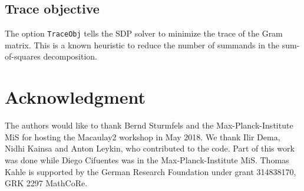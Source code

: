 \documentclass[11pt]{amsart}
\theoremstyle{plain}%
\theoremstyle{definition}
\theoremstyle{remark}
\newcommand{\Mac}{Macaulay2\xspace}
\begin{document}
\subsection*{Trace objective}
The option \verb|TraceObj| tells the SDP solver to minimize the trace of the Gram matrix.
This is a known heuristic to reduce the number of summands in the sum-of-squares decomposition.


\section*{Acknowledgment}
\label{sec:acknowledgement}
The authors would like to thank Bernd Sturmfels and the Max-Planck-Institute MiS for hosting the \Mac workshop in May 2018.
We thank Ilir Dema, Nidhi Kainsa and Anton Leykin, who contributed to the code.
Part of this work was done while Diego Cifuentes was in the Max-Planck-Institute MiS.
Thomas Kahle is supported by the German Research Foundation under grant 314838170, GRK 2297 MathCoRe.



\end{document}
